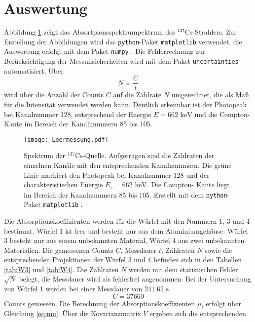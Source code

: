 \section{Auswertung}
Abbildung \ref{fig:spektrum} zeigt das Absortpionsspektrumpektrum des ${}^{137}\text{Cs}$-Strahlers.
Zur Erstellung der Abbildungen wird das \texttt{python}-Paket \texttt{matplotlib} \cite{Hunter:2007} verwendet, die Auswertung erfolgt
mit dem Paket \texttt{numpy} \cite{harris2020array}. Die Fehlerrechnung zur Berücksichtigung der Messunsicherheiten wird mit dem Paket \texttt{uncertainties} \cite{uncertainties}
automatisiert.
Über 
\begin{equation*}
    N = \frac{C}{t}
\end{equation*}
wird über die Anzahl der Counts $C$ auf die Zählrate $N$ umgerechnet, die als Maß für die Intensität
verwendet werden kann.
Deutlich erkennbar ist der Photopeak bei Kanalnummer 128, entsprechend der Energie $E= 662 \text{ keV}$ 
und die Compton-Kante im Bereich der Kanalnummern 85 bis 105. 
\begin{figure}
    \centering
    \texttt{[image: Leermessung.pdf]}
    \caption{Spektrum der ${}^{137}\text{Cs}$-Quelle. Aufgetragen sind die Zählraten der einzelnen
    Kanäle mit den entsprechenden Kanalnummern. Die grüne Linie markiert den Photopeak bei  
    Kanalnummer 128 und der charakteristischen Energie $E_\gamma = 662 \text{ keV}$. Die Compton-
    Kante liegt im Bereich der Kanalnummern 85 bis 105. Erstellt mit dem \texttt{python}-Paket \texttt{matplotlib} \cite{Hunter:2007}.}
    \label{fig:spektrum}
\end{figure}
Die Absorptionskoeffizienten werden für die Würfel mit den Nummern 1, 3 und 4 bestimmt. Würfel 1 ist leer und besteht nur aus dem Aluminiumgehäuse.
Würfel 3 besteht nur aus einem unbekannten Material, Würfel 4 aus zwei unbekannten Materialien. 
Die gemessenen Counts $C$, Messdauer $t$, Zählraten $N$ sowie die entsprechenden Projektionen der Würfel 3 und 4 
befinden sich in den Tabellen \ref{tab:W3} und \ref{tab:W4}. Die Zählraten $N$ werden mit dem statistischen Fehler $\sqrt{N}$
belegt, die Messdauer wird als fehlerfrei angenommen.
Bei der Untersuchung von Würfel 1 werden bei einer Messdauer von $241.62 \text{ s}$ 
\begin{equation*}
    C = 37660
\end{equation*}
Counts gemessen.  
Die Berechnung der Absorptionskoeffizienten $\mu_i$ erfolgt über Gleichung \ref{eq:mu}. Über die Kovarianzmatrix $V$ ergeben sich die entsprechenden 
